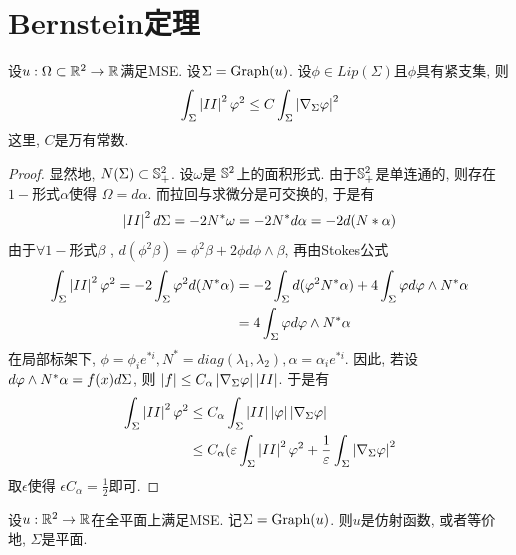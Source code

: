 \section{Bernstein定理}
\begin{proposition} \label{caccio}
    设$u: \Omega \subset \R^2 \to \R$满足MSE. 设$\Sigma=\G(u)$. 设$\phi \in Lip(\Sigma)$且$\phi$具有紧支集, 则
    \begin{equation}
        \int_{\Sigma}\abs{II}^2\phi^2 \le C\int_\Sigma \abs{\nabla_{\Sigma}\phi}^2
    \end{equation}
    这里,  $C$是万有常数.
\end{proposition}
\begin{proof}
    显然地, $\N(\Sigma) \subset \S^2_+$. 设$\omega$是 $\S^2$上的面积形式. 由于$\S^2_+$是单连通的, 则存在$1-$形式$\alpha$使得  $\Omega=d\alpha$. 而拉回与求微分是可交换的, 于是有 
    \begin{equation}
        \abs{II}^2d\Sigma=-2\N^*\omega=-2\N^*d\alpha=-2d(\N*\alpha)
    \end{equation}
    由于$\forall 1-$形式$\beta$ , $d(\phi^2\beta)=\phi^2\beta+2\phi d\phi\wedge\beta$, 再由Stokes公式
    \begin{equation}
        \begin{split}
            \int_\Sigma \abs{II}^2\phi^2 = -2 \int_\Sigma \phi^2 d(\N^*\alpha) &=-2\int_\Sigma d(\phi^2\N^*\alpha)+4\int_\Sigma \phi d\phi\wedge N^*\alpha\\
            &= 4\int_\Sigma  \phi d\phi\wedge N^*\alpha
        \end{split}
    \end{equation}
    在局部标架下, $\phi=\phi_i e^{*i}, N^*=diag(\lambda_1,\lambda_2), \alpha=\alpha_i e^{*i}$. 因此, 若设 $d\phi\wedge \N^*\alpha= f(x)d\Sigma$, 则 $\abs{f} \le C_\alpha \abs{\nabla_\Sigma \phi}\abs{II}$. 于是有
    \begin{equation}
        \begin{split}
            \int_\Sigma \abs{II}^2\phi^2 &\le C_\alpha \int_\Sigma \abs{II}\abs{\phi} \abs{\nabla_\Sigma \phi} \\
            & \le C_\alpha(\epsilon \int_\Sigma \abs{II}^2\phi^2 + \frac{1}{\epsilon}\int_\Sigma  \abs{\nabla_\Sigma \phi}^2 \\
        \end{split}
    \end{equation}
    取$\epsilon$使得 $\epsilon C_\alpha=\frac{1}{2}$即可.
\end{proof}
\begin{theorem}
    设$u: \R^2 \to \R$在全平面上满足MSE.  记$\Sigma=\G(u)$. 则$u$是仿射函数, 或者等价地, $\Sigma$是平面.
\end{theorem}
